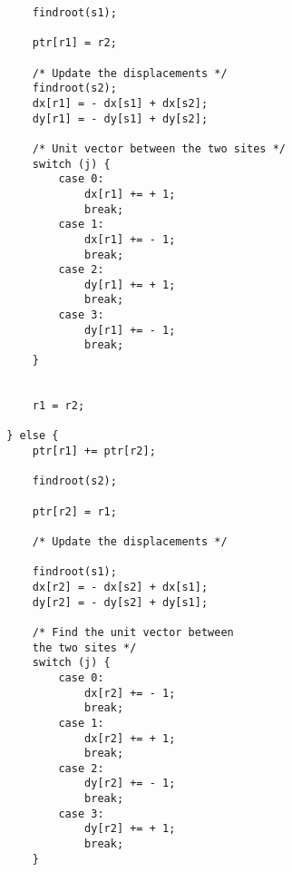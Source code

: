 \begin{verbatim}
                        findroot(s1);
                        
                        ptr[r1] = r2;       
                        
                        /* Update the displacements */
                        findroot(s2);
                        dx[r1] = - dx[s1] + dx[s2];
                        dy[r1] = - dy[s1] + dy[s2];
                        
                        /* Unit vector between the two sites */
                        switch (j) {
                            case 0:
                                dx[r1] += + 1;    
                                break;
                            case 1:
                                dx[r1] += - 1;      
                                break;
                            case 2: 
                                dy[r1] += + 1;        
                                break;
                            case 3:  
                                dy[r1] += - 1;        
                                break;
                        }
                        

                        r1 = r2;

                    } else {
                        ptr[r1] += ptr[r2];
                        
                        findroot(s2);
                        
                        ptr[r2] = r1;

                        /* Update the displacements */
                        
                        findroot(s1);
                        dx[r2] = - dx[s2] + dx[s1];
                        dy[r2] = - dy[s2] + dy[s1];

                        /* Find the unit vector between 
                        the two sites */
                        switch (j) {
                            case 0:
                                dx[r2] += - 1;   
                                break;
                            case 1:
                                dx[r2] += + 1;  
                                break;
                            case 2:
                                dy[r2] += - 1;        
                                break;
                            case 3:
                                dy[r2] += + 1;        
                                break;
                        }
                        

\end{verbatim}
